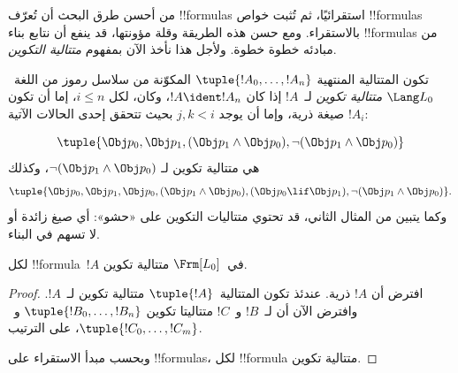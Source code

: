 \documentclass[../../../include/open-logic-section]{subfiles}
\begin{document}


من أحسن طرق البحث أن تُعرّف !!{formula}s استقرائيًا، ثم تُثبت خواص
!!{formula}s بالاستقراء. ومع حسن هذه الطريقة وقلة مؤونتها، قد ينفع أن نتابع بناء
!!{formula}s من مبادئه خطوة خطوة. ولأجل هذا نأخذ الآن بمفهوم
\emph{متتالية التكوين}.

\begin{defn}
تكون المتتالية المنتهية $\tuple{!A_0,\dotsc,!A_n}$ المكوّنة من سلاسل
رموز من اللغة~$\Lang L_0$ \emph{متتالية تكوين} لـ~$!A$ إذا كان
$!A \ident !A_n$، وكان، لكل $i \leq n$، إما أن تكون $!A_i$ صيغة ذرية،
وإما أن يوجد $j,k < i$ بحيث تتحقق إحدى الحالات الآتية:
\begin{enumerate}
\end{enumerate}
\end{defn}

\begin{ex}
\[
\tuple{
    \Obj p_0,
    \Obj p_1,
    (\Obj p_1 \land \Obj p_0),
    \lnot (\Obj p_1 \land \Obj p_0)
}
\]
هي متتالية تكوين لـ
$\lnot (\Obj p_1 \land \Obj p_0)$، وكذلك
\[
\tuple{
    \Obj p_0,
    \Obj p_1,
    \Obj p_0,
    (\Obj p_1 \land \Obj p_0),
    (\Obj p_0 \lif \Obj p_1),
    \lnot (\Obj p_1 \land \Obj p_0)
}.
\]
%
وكما يتبين من المثال الثاني، قد تحتوي متتاليات التكوين على «حشو»:
أي صيغ زائدة أو لا تسهم في البناء.
\end{ex}

\begin{prop}
لكل !!{formula}~$!A$ في~$\Frm[L_0]$ متتالية تكوين.
\end{prop}

\begin{proof}
افترض أن $!A$ ذرية. عندئذ تكون المتتالية~$\tuple{!A}$ متتالية
تكوين لـ~$!A$.
%
وافترض الآن أن لـ~$!B$ و~$!C$ متتاليتا تكوين
$\tuple{!B_0,\dotsc,!B_n}$ و~$\tuple{!C_0,\dotsc,!C_m}$،
على الترتيب.
%
\begin{enumerate}
\end{enumerate}
وبحسب مبدأ الاستقراء على !!{formula}s، لكل
!!{formula} متتالية تكوين.
\end{proof}
\end{document}
